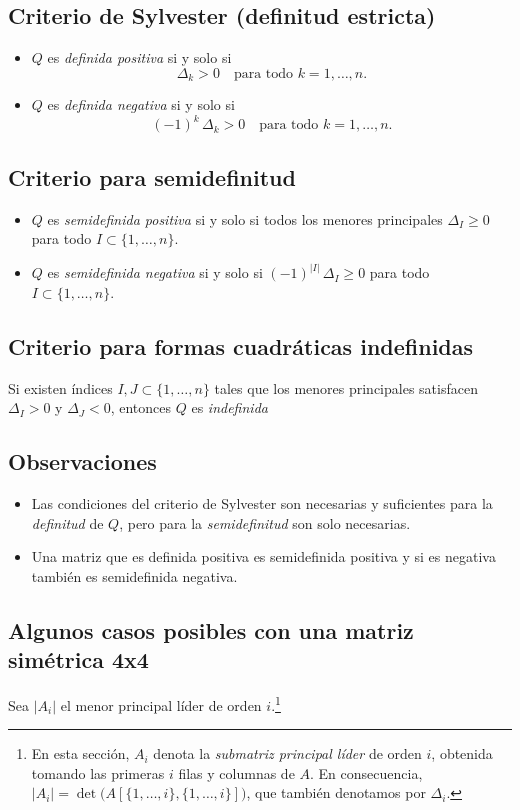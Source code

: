 \documentclass{article}
\begin{document}
\subsection*{Criterio de Sylvester (definitud estricta)}
\begin{itemize}\color{teal}
  \item \(Q\) es \emph{definida positiva} si y solo si  
  \[
    \Delta_k > 0
    \quad\text{para todo }k=1,\dots,n.
  \]
  \item \(Q\) es \emph{definida negativa} si y solo si  
  \[
    (-1)^k\,\Delta_k > 0
    \quad\text{para todo }k=1,\dots,n.
  \]
\end{itemize}

\subsection*{Criterio para semidefinitud}
\begin{itemize}\color{teal}
  \item \(Q\) es \emph{semidefinida positiva} si y solo si todos los menores principales 
  \(\Delta_I\ge0\) para todo \(I\subset\{1,\dots,n\}\).
  \item \(Q\) es \emph{semidefinida negativa} si y solo si 
  \((-1)^{|I|}\,\Delta_I\ge0\) para todo \(I\subset\{1,\dots,n\}\).
\end{itemize}


\subsection*{Criterio para formas cuadráticas indefinidas}
Si existen índices \(I,J\subset\{1,\dots,n\}\) tales que los menores principales satisfacen \(\Delta_I>0\) y \(\Delta_J<0\), entonces \(Q\) es \emph{indefinida}


\subsection*{Observaciones}
\begin{itemize}
  \item Las condiciones del criterio de Sylvester son necesarias y suficientes para la \emph{definitud} de \(Q\), pero para la \emph{semidefinitud} son solo necesarias.
  \item Una matriz que es definida positiva es semidefinida positiva y si es negativa también es semidefinida negativa.
\end{itemize}


\subsection*{Algunos casos posibles con una matriz simétrica 4x4}
Sea $|A_i|$ el menor principal líder de orden $i$.\footnote{En esta sección, $A_i$ denota la \emph{submatriz principal líder} de orden $i$, obtenida tomando las primeras $i$ filas y columnas de $A$. En consecuencia, $|A_i|=\det\!\big(A[\{1,\dots,i\},\{1,\dots,i\}]\big)$, que también denotamos por $\Delta_i$.}
\end{document}
